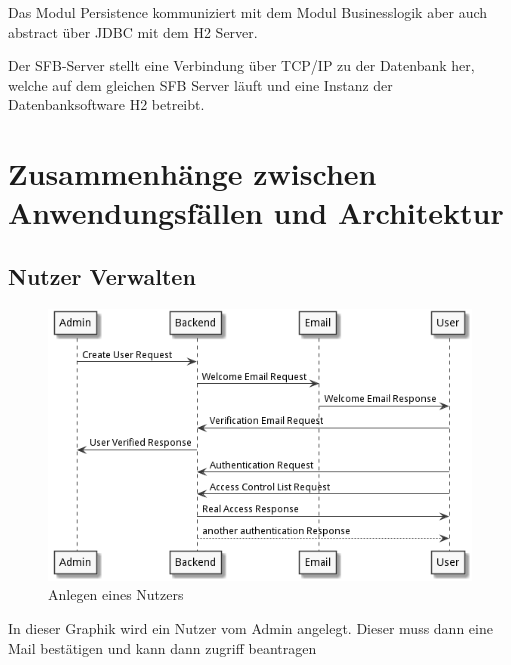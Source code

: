 \documentclass[enabledeprecatedfontcommands,fontsize=12pt,paper=a4,twoside]{scrartcl}
\begin{document}
{{Das Modul Persistence kommuniziert mit dem Modul Businesslogik aber auch
\glqq abstract\grqq{} über JDBC mit dem H2 Server.

Der SFB-Server stellt eine Verbindung über TCP/IP zu der
Datenbank her, welche auf dem gleichen SFB Server läuft und eine Instanz der Datenbanksoftware H2 betreibt.
}

\section[Zusammenhänge zwischen Anwendungsfällen und Architektur]{Zusammenhänge zwischen Anwendungsfällen und Architektur}
\label{sec:anwendungsfaelle}


\subsection{Nutzer Verwalten}
\begin{figure}[H]
  \includegraphics[width=\linewidth]{UML/seq.png}
  \caption{Anlegen eines Nutzers}
  \label{fig:pkErstellen}
\end{figure}
In dieser Graphik wird ein Nutzer vom Admin angelegt. Dieser muss dann eine Mail bestätigen und kann dann zugriff beantragen


}
\end{document}
